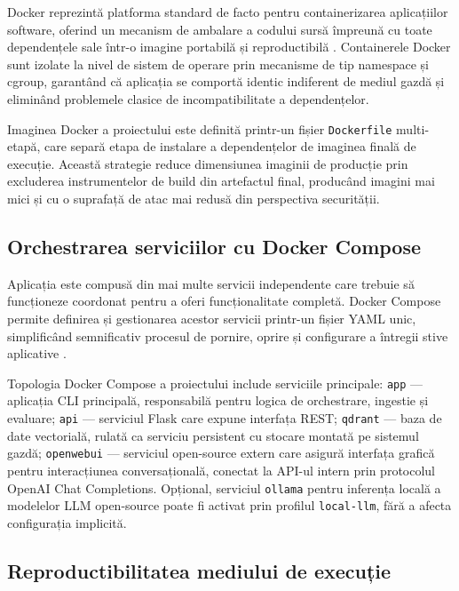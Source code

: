 \documentclass[12pt, a4paper, oneside, romanian]{teza-upb}
\begin{document}
Docker reprezintă platforma standard de facto pentru containerizarea aplicațiilor software, oferind un mecanism de ambalare a codului sursă împreună cu toate dependențele sale într-o imagine portabilă și reproductibilă \cite{docker_doc}. Containerele Docker sunt izolate la nivel de sistem de operare prin mecanisme de tip namespace și cgroup, garantând că aplicația se comportă identic indiferent de mediul gazdă și eliminând problemele clasice de incompatibilitate a dependențelor.

Imaginea Docker a proiectului este definită printr-un fișier \texttt{Dockerfile} multi-etapă, care separă etapa de instalare a dependențelor de imaginea finală de execuție. Această strategie reduce dimensiunea imaginii de producție prin excluderea instrumentelor de build din artefactul final, producând imagini mai mici și cu o suprafață de atac mai redusă din perspectiva securității.

\subsection{Orchestrarea serviciilor cu Docker Compose}

Aplicația este compusă din mai multe servicii independente care trebuie să funcționeze coordonat pentru a oferi funcționalitate completă. Docker Compose permite definirea și gestionarea acestor servicii printr-un fișier YAML unic, simplificând semnificativ procesul de pornire, oprire și configurare a întregii stive aplicative \cite{docker_compose_doc}.

Topologia Docker Compose a proiectului include serviciile principale: \texttt{app} — aplicația CLI principală, responsabilă pentru logica de orchestrare, ingestie și evaluare; \texttt{api} — serviciul Flask care expune interfața REST; \texttt{qdrant} — baza de date vectorială, rulată ca serviciu persistent cu stocare montată pe sistemul gazdă; \texttt{openwebui} — serviciul open-source extern care asigură interfața grafică pentru interacțiunea conversațională, conectat la API-ul intern prin protocolul OpenAI Chat Completions. Opțional, serviciul \texttt{ollama} pentru inferența locală a modelelor LLM open-source poate fi activat prin profilul \texttt{local-llm}, fără a afecta configurația implicită.

\subsection{Reproductibilitatea mediului de execuție}
\end{document}
